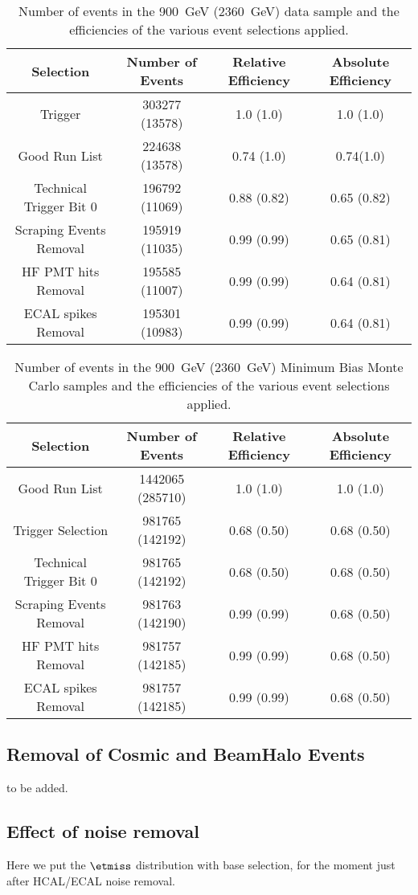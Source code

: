 \begin{table}[!ht]
  \begin{center}
    \begin{tabular}{|c|c|c|c|}
      \hline
      Selection      & Number of Events  & Relative Efficiency   &
      Absolute Efficiency\\
      \hline\hline
      Trigger                            & 303277 (13578) & 1.0 (1.0)&1.0 (1.0) \\ 
      Good Run List                 & 224638 (13578) & 0.74 (1.0) & 0.74(1.0)  \\
      Technical Trigger Bit 0    & 196792 (11069) & 0.88 (0.82) & 0.65 (0.82)\\
      Scraping Events Removal& 195919 (11035) & 0.99 (0.99) & 0.65 (0.81) \\
      HF PMT hits Removal      & 195585 (11007) & 0.99 (0.99) & 0.64 (0.81)\\
      ECAL spikes Removal     & 195301 (10983) & 0.99 (0.99) & 0.64 (0.81) \\ \hline
  \end{tabular}
    \caption{Number of events in the 900~GeV (2360~GeV) data sample and
      the efficiencies of the various event selections applied.}
    \label{tab:Higgssamples}
  \end{center}
\end{table}

\begin{table}[!ht]
  \begin{center}
    \begin{tabular}{|c|c|c|c|}
      \hline
      Selection      & Number of Events  & Relative Efficiency   &
      Absolute Efficiency\\
      \hline\hline
      Good Run List                 & 1442065 (285710) & 1.0 (1.0) & 1.0 (1.0)  \\
      Trigger Selection             & 981765 (142192) & 0.68 (0.50)& 0.68 (0.50) \\ 
      Technical Trigger Bit 0    & 981765 (142192) & 0.68 (0.50) & 0.68 (0.50)\\
      Scraping Events Removal& 981763 (142190) & 0.99 (0.99) & 0.68 (0.50) \\
      HF PMT hits Removal      & 981757 (142185) & 0.99 (0.99) & 0.68 (0.50)\\
      ECAL spikes Removal     & 981757 (142185) & 0.99 (0.99) & 0.68 (0.50) \\ \hline
    \end{tabular}
    \caption{Number of events in the 900~GeV (2360~GeV) Minimum Bias
      Monte Carlo samples and the efficiencies of the various event
      selections applied.}
    \label{tab:Higgssamples}
  \end{center}
\end{table}

\subsection{Removal of Cosmic and BeamHalo Events}
to be added.

\subsection{Effect of noise removal}
Here we put the $\etmiss$ distribution with base selection, for the moment just 
after HCAL/ECAL noise removal.

\clearpage

